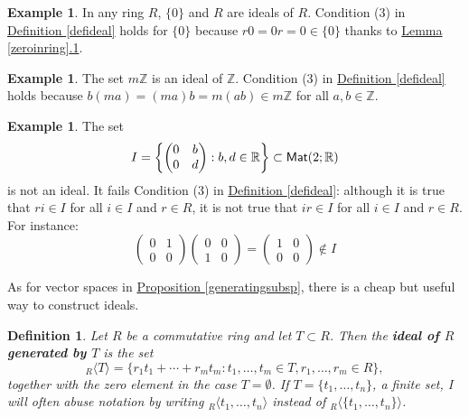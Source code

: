 \documentclass[11pt]{amsbook}
\newtheorem{definition}[theorem]{Definition}
\theoremstyle{definition}
\newtheorem{ex}[theorem]{Example}
\begin{document}
\begin{ex}
In any ring $R$, $\{ 0 \}$ and $R$ are ideals of $R$. Condition (3) in \hyperref[defideal]{Definition \ref{defideal}} holds for $\{ 0 \}$ because $r0 = 0r = 0 \in \{ 0 \}$ thanks to \hyperref[zeroinring]{Lemma \ref{zeroinring}.1}.
\end{ex}

\begin{ex}
The set $m\mathbb{Z}$ is an ideal of $\mathbb{Z}$. Condition (3) in \hyperref[defideal]{Definition \ref{defideal}} holds because $b(ma) = (ma)b = m (ab) \in m\mathbb{Z}$ for all $a,b\in \mathbb{Z}$.
\end{ex}

\begin{ex} The set $$I = \left\{ \begin{pmatrix} 0 & b \\ 0 & d \end{pmatrix} : b,d \in \mathbb{R} \right\} \subset {\sf Mat}(2; \mathbb{R})$$ is not an ideal. It fails Condition (3) in \hyperref[defideal]{Definition \ref{defideal}}: although it is true that $ri \in I$ for all $i\in I$ and $r\in R$, it is not true that $ir\in I$ for all $i\in I$ and $r\in R$. For instance: $$ \begin{pmatrix} 0 & 1 \\ 0 & 0 \end{pmatrix} \begin{pmatrix} 0 & 0 \\ 1 & 0 \end{pmatrix} = \begin{pmatrix} 1 & 0 \\ 0 & 0 \end{pmatrix} \notin I $$
\end{ex}

As for vector spaces in \hyperref[generatingsubsp]{Proposition \ref{generatingsubsp}}, there is a cheap but useful way to construct ideals.

\begin{definition}\label{genideals} Let $R$ be a commutative ring and let $T \subset R$. Then the {\bf ideal of $R$ generated by $T$} is the set $${}_R\langle T \rangle =  \{  r_1t_1 + \cdots + r_mt_m : t_1, \ldots , t_m \in T, r_1, \ldots , r_m\in R\},$$ together with the zero element in the case $T =\emptyset$. If $T = \{t_1, \ldots , t_n \}$, a finite set, I will often abuse notation by writing ${}_R\langle t_1, \ldots , t_n \rangle$ instead of ${}_R\langle \{ t_1, \ldots , t_n \}\rangle$.
\end{definition}
\end{document}
